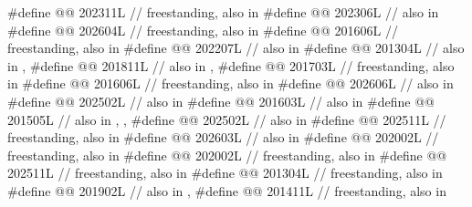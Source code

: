 \begin{codeblock}
#define @@              202311L // freestanding, also in 
#define @@             202306L // also in 
#define @@                      202604L // freestanding, also in 
#define @@                           201606L // freestanding, also in 
#define @@                         202207L // also in 
#define @@        201304L // also in , 
#define @@          201811L
  // also in , 
#define @@        201703L // freestanding, also in 
#define @@ 201606L // freestanding, also in 
#define @@                    202606L // also in 
#define @@                              202502L // also in 
#define @@                             201603L // also in 
#define @@     201505L
  // also in , , 
#define @@                          202502L // also in 
#define @@                  202511L
  // freestanding, also in 
#define @@                    202603L // also in 
#define @@                          202002L // freestanding, also in 
#define @@      202002L // freestanding, also in 
#define @@                  202511L // freestanding, also in 
#define @@        201304L // freestanding, also in 
#define @@                       201902L // also in , 
#define @@                            201411L // freestanding, also in 

\end{codeblock}
